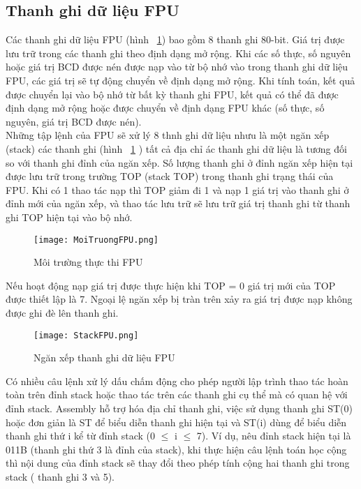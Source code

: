 	\newpage
		\subsection*{Thanh ghi dữ liệu FPU}
	Các thanh ghi dữ liệu FPU (hình ~\ref{fig:MoiTruongFPU}) bao gồm 8 thanh ghi 80-bit. Giá trị được lưu trữ trong các thanh ghi theo định dạng mở rộng. Khi các số thực, số nguyên hoặc giá trị BCD được nén được nạp vào từ bộ nhớ vào trong thanh ghi dữ liệu FPU, các giá trị sẽ tự động chuyển về định dạng mở rộng. Khi tính toán, kết quả được chuyển lại vào bộ nhớ từ bất kỳ thanh ghi FPU, kết quả có thể đã được định dạng mở rộng hoặc được chuyển về định dạng FPU khác (số thực, số nguyên, giá trị BCD được nén).\\

	Những tập lệnh của FPU sẽ xử lý 8 thnh ghi dữ liệu nhưu là một ngăn xếp (stack) các thanh ghi (hình ~\ref{fig:MoiTruongFPU} ) tất cả địa chỉ ác thanh ghi dữ liệu là tương đối so với thanh ghi đỉnh của ngăn xếp. Số lượng thanh ghi ở đỉnh ngăn xếp hiện tại được lưu trữ trong trường TOP (stack TOP) trong thanh ghi trạng thái của FPU. Khi có 1 thao tác nạp thì TOP giảm đi 1 và nạp 1 giá trị vào thanh ghi ở đỉnh mới của ngăn xếp, và thao tác lưu trữ sẽ lưu trữ giá trị thanh ghi từ thanh ghi TOP hiện tại vào bộ nhớ.
		\begin{center}
			\begin{figure}[htp]
				\begin{center}
					\texttt{[image: MoiTruongFPU.png]}
				\end{center}
				\caption{Môi trường thực thi FPU}				
				\label{fig:MoiTruongFPU}				
			\end{figure}
		\end{center}		
		
	Nếu hoạt động nạp giá trị được thực hiện khi TOP = 0 giá trị mới của TOP được thiết lập là 7. Ngoại lệ ngăn xếp bị tràn trên xảy ra giá trị được nạp không được ghi đè lên thanh ghi.			
			\begin{center}
			\begin{figure}[htp]
				\begin{center}
					\texttt{[image: StackFPU.png]}
				\end{center}
				\caption{Ngăn xếp thanh ghi dữ liệu FPU}				
				\label{fig:StackFPU}				
			\end{figure}
		\end{center}		
			
			Có nhiều câu lệnh xử lý dấu chấm động cho phép người lập trình thao tác hoàn toàn trên đỉnh stack hoặc thao tác trên các thanh ghi cụ thể mà có quan hệ với đỉnh stack. Assembly hỗ trợ hóa địa chỉ thanh ghi, việc sử dụng thanh ghi ST(0) hoặc đơn giản là ST để biểu diễn thanh ghi hiện tại và ST(i) dùng để biểu diễn thanh ghi thứ i kể từ đỉnh stack (0 $\mathbb{\le}$ i  $\mathbb{\le}$ 7). Ví dụ, nêu đỉnh stack hiện tại là 011B (thanh ghi thứ 3 là đỉnh của stack), khi thực hiện câu lệnh toán học cộng thì nội dung của đỉnh stack sẽ thay đổi theo phép tính cộng hai thanh ghi trong stack ( thanh ghi 3 và 5).
			
